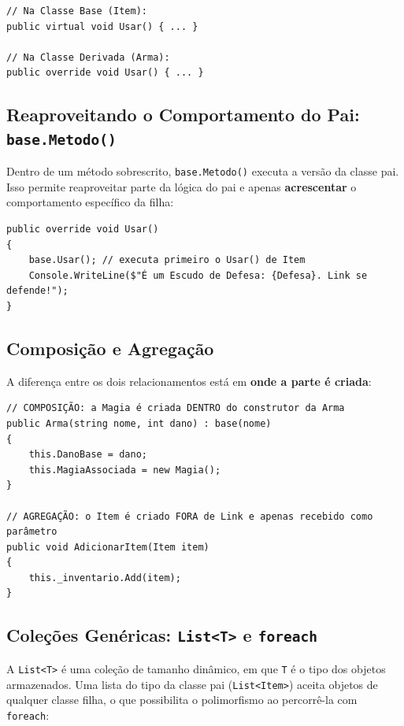 \begin{lstlisting}[style=csharp]
// Na Classe Base (Item):
public virtual void Usar() { ... }

// Na Classe Derivada (Arma):
public override void Usar() { ... }
\end{lstlisting}

\subsection{Reaproveitando o Comportamento do Pai: \texttt{base.Metodo()}}

Dentro de um método sobrescrito, \texttt{base.Metodo()} executa a versão da classe pai. Isso
permite reaproveitar parte da lógica do pai e apenas \textbf{acrescentar} o comportamento
específico da filha:

\begin{lstlisting}[style=csharp]
public override void Usar()
{
    base.Usar(); // executa primeiro o Usar() de Item
    Console.WriteLine($"É um Escudo de Defesa: {Defesa}. Link se defende!");
}
\end{lstlisting}

\subsection{Composição e Agregação}

A diferença entre os dois relacionamentos está em \textbf{onde a parte é criada}:

\begin{lstlisting}[style=csharp]
// COMPOSIÇÃO: a Magia é criada DENTRO do construtor da Arma
public Arma(string nome, int dano) : base(nome)
{
    this.DanoBase = dano;
    this.MagiaAssociada = new Magia();
}

// AGREGAÇÃO: o Item é criado FORA de Link e apenas recebido como parâmetro
public void AdicionarItem(Item item)
{
    this._inventario.Add(item);
}
\end{lstlisting}

\subsection{Coleções Genéricas: \texttt{List<T>} e \texttt{foreach}}

A \texttt{List<T>} é uma coleção de tamanho dinâmico, em que \texttt{T} é o tipo dos objetos
armazenados. Uma lista do tipo da classe pai (\texttt{List<Item>}) aceita objetos de qualquer
classe filha, o que possibilita o polimorfismo ao percorrê-la com \texttt{foreach}:

